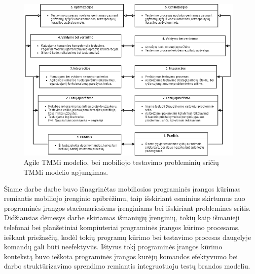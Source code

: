 \documentclass{VUMIFPSkursinis}
\begin{document}
\begin{figure}[H]
    \centering
    \includegraphics[scale=0.75, angle=90]{img/agilemobile}
    \caption{Agile TMMi modelio, bei mobiliojo testavimo probleminių sričių TMMi modelio apjungimas.}
    \label{img:agilemobile}
\end{figure}

Šiame darbe darbe buvo išnagrinėtas mobiliosios programinės įrangos kūrimas remiantis mobiliojo įrenginio apibrėžimu, taip išskiriant esminius skirtumus nuo programinės įrangos stacionariesiems įrenginiams bei išskiriant problemines sritis. Didžiausias dėmesys darbe skiriamas išmaniųjų įrenginių, tokių kaip išmanieji telefonai bei planšetiniai kompiuteriai programinės įrangos kūrimo procesams, ieškant priežasčių, kodėl tokių programų kūrimo bei testavimo procesas daugelyje komandų gali būti neefektyvūs. Ištyrus tokį programinės įrangos kūrimo kontekstą buvo ieškota programinės įrangos kūrėjų komandos efektyvumo bei darbo struktūrizavimo sprendimo remiantis integruotuoju testų brandos modeliu.
\end{document}
